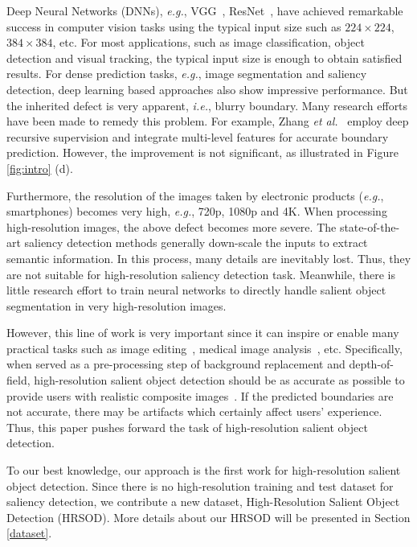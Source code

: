 Deep Neural Networks (DNNs), \emph{e.g.}, VGG~\cite{simonyan2014very}, ResNet~\cite{he2016deep}, have achieved remarkable success in computer vision tasks using the typical input size such as $224\times224$, $384\times384$, etc. For most applications, such as image classification, object detection and visual tracking, the typical input size is enough to obtain satisfied results. For dense prediction tasks, \emph{e.g.}, image segmentation and saliency detection, deep learning based approaches also show impressive performance. But the inherited defect is very apparent, \emph{i.e.}, blurry boundary. Many research efforts have been made to remedy this problem. For example, Zhang \emph{et al.}~\cite{zhang2017amulet} employ deep recursive supervision and integrate multi-level features for accurate boundary prediction. However, the improvement is not significant, as illustrated in Figure \ref{fig:intro} (d).

Furthermore, the resolution of the images taken by electronic products (\emph{e.g.}, smartphones) becomes very high, \emph{e.g.}, 720p, 1080p and 4K. When processing high-resolution images, the above defect becomes more severe. The state-of-the-art saliency detection methods generally down-scale the inputs to extract semantic information. In this process, many details are inevitably lost. Thus, they are not suitable for high-resolution saliency detection task. Meanwhile, there is little research effort to train neural networks to directly handle salient object segmentation in very high-resolution images.

However, this line of work is very important since it can inspire or enable many practical tasks such as image editing~\cite{tsai2016sky,xiao2019auto,lischinski2006interactive}, medical image analysis~\cite{chen2019learning}, etc. Specifically, when served as a pre-processing step of background replacement and depth-of-field, high-resolution salient object detection should be as accurate as possible to provide users with realistic composite images~\cite{shen2016automatic}. If the predicted boundaries are not accurate, there may be artifacts which certainly affect users' experience. Thus, this paper pushes forward the task of high-resolution salient object detection.

To our best knowledge, our approach is the first work for high-resolution salient object detection. Since there is no high-resolution training and test dataset for saliency detection, we contribute a new dataset, High-Resolution Salient Object Detection (HRSOD). More details about our HRSOD will be presented in Section \ref{dataset}.

